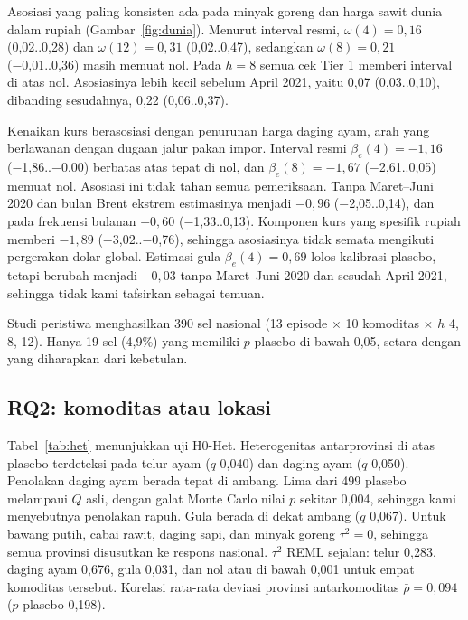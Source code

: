 \documentclass[11pt,a4paper]{article}
\newcommand{\ci}[2]{(#1..#2)}
\begin{document}
Asosiasi yang paling konsisten ada pada minyak goreng dan harga sawit dunia dalam rupiah (Gambar~\ref{fig:dunia}). Menurut interval resmi,
$\omega(4) = 0,16$ \ci{0,02}{0,28} dan $\omega(12) = 0,31$ \ci{0,02}{0,47}, sedangkan $\omega(8) = 0,21$ \ci{−0,01}{0,36} masih
memuat nol. Pada $h=8$ semua cek Tier 1 memberi interval di atas nol. Asosiasinya lebih kecil sebelum April 2021, yaitu 0,07
\ci{0,03}{0,10}, dibanding sesudahnya, 0,22 \ci{0,06}{0,37}.

Kenaikan kurs berasosiasi dengan penurunan harga daging ayam, arah yang berlawanan dengan dugaan jalur pakan impor. Interval resmi
$\beta_e(4) = -1,16$ \ci{−1,86}{−0,00} berbatas atas tepat di nol, dan $\beta_e(8) = -1,67$ \ci{−2,61}{0,05} memuat nol. Asosiasi ini
tidak tahan semua pemeriksaan. Tanpa Maret–Juni 2020 dan bulan Brent ekstrem estimasinya menjadi $-0,96$ \ci{−2,05}{0,14}, dan pada
frekuensi bulanan $-0,60$ \ci{−1,33}{0,13}. Komponen kurs yang spesifik rupiah memberi $-1,89$ \ci{−3,02}{−0,76}, sehingga asosiasinya
tidak semata mengikuti pergerakan dolar global. Estimasi gula $\beta_e(4) = 0,69$ lolos kalibrasi plasebo, tetapi berubah menjadi
$-0,03$ tanpa Maret–Juni 2020 dan sesudah April 2021, sehingga tidak kami tafsirkan sebagai temuan.

Studi peristiwa menghasilkan 390 sel nasional (13 episode $\times$ 10 komoditas $\times$ $h$ 4, 8, 12). Hanya 19 sel (4,9\%) yang
memiliki $p$ plasebo di bawah 0,05, setara dengan yang diharapkan dari kebetulan.

\subsection{RQ2: komoditas atau lokasi}

Tabel~\ref{tab:het} menunjukkan uji H0-Het. Heterogenitas antarprovinsi di atas plasebo terdeteksi pada telur ayam ($q$ 0,040) dan
daging ayam ($q$ 0,050). Penolakan daging ayam berada tepat di ambang. Lima dari 499 plasebo melampaui $Q$ asli, dengan galat Monte
Carlo nilai $p$ sekitar 0,004, sehingga kami menyebutnya penolakan rapuh. Gula berada di dekat ambang ($q$ 0,067). Untuk bawang putih,
cabai rawit, daging sapi, dan minyak goreng $\tau^2 = 0$, sehingga semua provinsi disusutkan ke respons nasional. $\tau^2$ REML
sejalan: telur 0,283, daging ayam 0,676, gula 0,031, dan nol atau di bawah 0,001 untuk empat komoditas tersebut. Korelasi rata-rata
deviasi provinsi antarkomoditas $\bar\rho = 0,094$ ($p$ plasebo 0,198).
\end{document}
